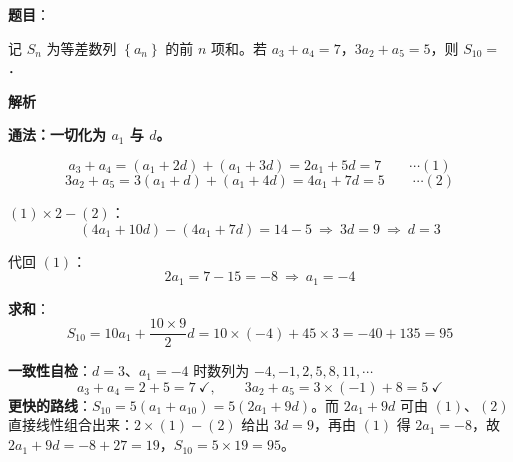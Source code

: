 \begin{answer}

\textbf{题目}：

记 $S_n$ 为等差数列 $\left\{a_n\right\}$ 的前 $n$ 项和。若 $a_3+a_4=7$，$3a_2+a_5=5$，则 $S_{10}=$ \gkblank{}．

\textbf{解析}

\textbf{通法：一切化为 $a_1$ 与 $d$。}

\nopagebreak[4]
\[a_3+a_4=\left(a_1+2d\right)+\left(a_1+3d\right)=2a_1+5d=7\qquad\cdots(1)\]
\nopagebreak[4]
\[3a_2+a_5=3\left(a_1+d\right)+\left(a_1+4d\right)=4a_1+7d=5\qquad\cdots(2)\]

$(1)\times2-(2)$：
\nopagebreak[4]
\[\left(4a_1+10d\right)-\left(4a_1+7d\right)=14-5\ \Longrightarrow\ 3d=9\ \Longrightarrow\ d=3\]

代回 $(1)$：
\nopagebreak[4]
\[2a_1=7-15=-8\ \Longrightarrow\ a_1=-4\]

\textbf{求和}：
\nopagebreak[4]
\[S_{10}=10a_1+\frac{10\times9}2d=10\times(-4)+45\times3=-40+135=95\]

\begin{gktip}
\textbf{一致性自检}：$d=3$、$a_1=-4$ 时数列为 $-4,-1,2,5,8,11,\cdots$
\nopagebreak[4]
\[a_3+a_4=2+5=7\ \checkmark,\qquad 3a_2+a_5=3\times(-1)+8=5\ \checkmark\]
\textbf{更快的路线}：$S_{10}=5\left(a_1+a_{10}\right)=5\left(2a_1+9d\right)$。而 $2a_1+9d$ 可由 $(1)$、$(2)$ 直接线性组合出来：$2\times(1)-(2)$ 给出 $3d=9$，再由 $(1)$ 得 $2a_1=-8$，故 $2a_1+9d=-8+27=19$，$S_{10}=5\times19=95$。
\end{gktip}


\par\medskip

\end{answer}
